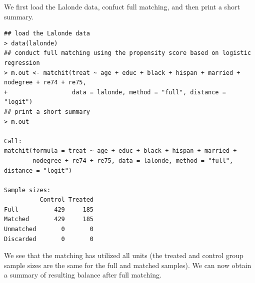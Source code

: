 \documentclass[oneside,letterpaper,titlepage]{article}
\begin{document}
We first load the Lalonde data, confuct full matching, and then print
a short summary.
\begin{verbatim}
## load the Lalonde data
> data(lalonde)
## conduct full matching using the propensity score based on logistic regression
> m.out <- matchit(treat ~ age + educ + black + hispan + married + nodegree + re74 + re75, 
+                  data = lalonde, method = "full", distance = "logit")
## print a short summary
> m.out

Call: 
matchit(formula = treat ~ age + educ + black + hispan + married +     
        nodegree + re74 + re75, data = lalonde, method = "full", distance = "logit")

Sample sizes:
          Control Treated
Full          429     185
Matched       429     185
Unmatched       0       0
Discarded       0       0
\end{verbatim}
We see that the matching has utilized all units (the treated and
control group sample sizes are the same for the full and matched
samples). We can now obtain a summary of resulting balance after full
matching.
\end{document}

